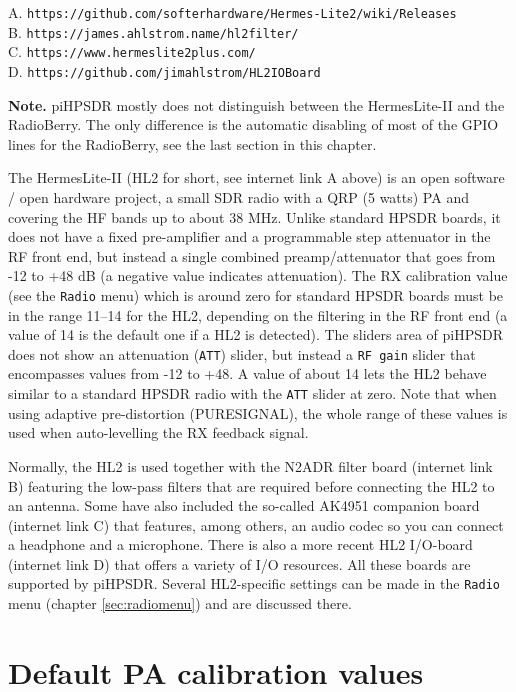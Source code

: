 \documentclass[12pt]{book}
\def\bltt#1{\texttt{\color{blue}#1}}
\def\pH{pi\-HPSDR\xspace}
\begin{document}
A. \texttt{https://github.com/softerhardware/Hermes-Lite2/wiki/Releases} \\
B. \texttt{https://james.ahlstrom.name/hl2filter/}  \\
C. \texttt{https://www.hermeslite2plus.com/}\\
D. \texttt{https://github.com/jimahlstrom/HL2IOBoard}

\textbf{Note.} \pH mostly does not distinguish between the HermesLite-II and the RadioBerry.
The only difference is the automatic disabling of most of the GPIO lines for the RadioBerry,
see the last section in this chapter.

The HermesLite-II (HL2 for  short, see internet link A above) is an open software / open hardware project,
a small SDR radio with a QRP (5 watts) PA
and covering the HF bands up to about 38 MHz. Unlike standard HPSDR boards, it does not have a fixed
pre-amplifier and a programmable step attenuator in the RF front end, but instead a single combined
preamp/attenuator that goes from -12 to +48 dB (a negative value indicates attenuation). The RX
calibration value (see the \bltt{Radio} menu) which is around zero for standard HPSDR boards must
be in the range 11--14 for the HL2, depending on the filtering in the RF front end
(a value of 14 is the default one if a HL2 is detected). The sliders
area of \pH does not show an attenuation (\texttt{ATT}) slider, but instead a \texttt{RF gain}
slider that encompasses values from -12 to +48. A value of about 14 lets the HL2 behave similar
to a standard HPSDR radio with the \texttt{ATT} slider at zero. Note that when using adaptive
pre-distortion (PURESIGNAL), the whole range of these values is used when auto-levelling the
RX feedback signal.

Normally, the HL2 is used together with the N2ADR  filter
board (internet link B) featuring the low-pass filters that are required before connecting the HL2 to an antenna.
Some have also included the so-called AK4951 companion board (internet link C) that features, among others,
 an audio codec so you can connect a headphone and a microphone. There is also a more recent HL2 I/O-board
 (internet link D) that offers a variety of I/O resources. All these boards are supported by \pH.
 Several HL2-specific settings can be made in the \bltt{Radio} menu (chapter \ref{sec:radiomenu}) and
 are discussed there.

\section{Default PA calibration values}
\end{document}
